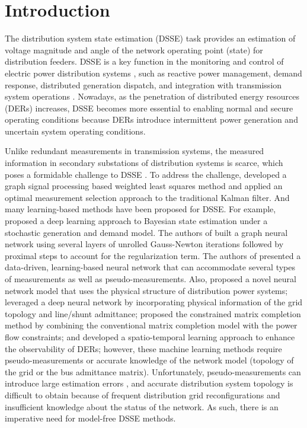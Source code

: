 \documentclass[journal]{IEEEtran}
\newcounter{propose}
\newcommand{\revision}[1]{{\color{black} #1}} %
\begin{document}
\section{Introduction}
The distribution system state estimation (DSSE) task provides an estimation of voltage magnitude and angle of the network operating point (state) for distribution feeders. DSSE is a key function in the monitoring and control of electric power distribution systems \cite{Wang2019Frontiers}, such as reactive power management, demand response, distributed generation dispatch, and integration with transmission system operations \cite{McDermott2009PES}. Nowadays, as the penetration of distributed energy resources  (DERs) increases, DSSE becomes more essential to enabling normal and secure operating conditions because DERs introduce intermittent power generation and uncertain system operating conditions.

Unlike redundant measurements in transmission systems, the measured information in secondary substations of distribution systems is scarce, which poses a formidable challenge to DSSE \cite{Jabr2010IET}. To address the challenge, \revision{\cite{Dabush2021} developed a graph signal processing based weighted least squares method  and \cite{Zhang2011}  applied an optimal measurement selection approach  to the traditional Kalman filter.}
And many learning-based methods have been proposed for DSSE. For example, \cite{mestav2019bayesian} proposed a deep learning approach to Bayesian state estimation under a stochastic generation and demand model. The authors of \cite{Yang2020arXiv} built a graph neural network using several layers of unrolled Gauss-Newton iterations followed by proximal steps to account for the regularization term. The authors of \cite{zamzam2019data} presented a data-driven, learning-based neural network that can accommodate several types of measurements as well as pseudo-measurements. Also, \cite{Zamzam2020IEEEPS} proposed a novel neural network model that uses the physical structure of distribution power systems;  \cite{Ostrometzky2019arXiv} leveraged a deep neural network by incorporating physical information of the grid topology and line/shunt admittance;  \cite{donti2019matrix, Sagan2019, LiuSmartGridComm} proposed the constrained matrix completion method by combining the conventional matrix completion model with the power flow constraints; and \cite{Lin2021arXiv} developed a spatio-temporal learning approach to enhance the observability of DERs;
however, these machine learning methods require pseudo-measurements or accurate knowledge of the network model (topology of the grid or the bus admittance matrix).  Unfortunately, pseudo-measurements \revision{\cite{Filho2007}} can introduce large estimation errors \cite{Clements2011}, and accurate distribution system topology is difficult to obtain because of frequent distribution grid reconfigurations  and insufficient knowledge about the status of the network\cite{Kekatos2013IEEEPS,Muscas2015IEEIM}. As such, there is an imperative need for model-free DSSE methods.
\end{document}
